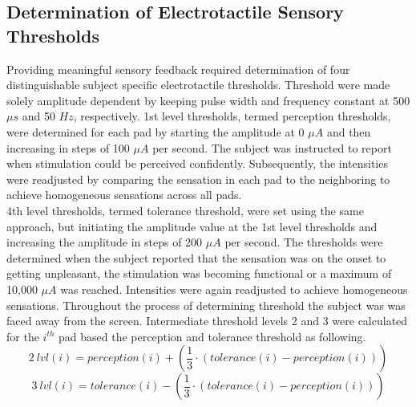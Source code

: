 
\subsection{Determination of Electrotactile Sensory Thresholds}


Providing meaningful sensory feedback required determination of four distinguishable subject specific electrotactile thresholds. Threshold were made solely amplitude dependent by keeping pulse width and frequency constant at 500 $\mu s$ and 50 $Hz$, respectively. 1st level thresholds, termed perception thresholds, were determined for each pad by starting the amplitude at 0 $\mu A$ and then increasing in steps of 100 $\mu A$ per second. The subject was instructed to report when stimulation could be perceived confidently. Subsequently, the intensities were readjusted by comparing the sensation in each pad to the neighboring to achieve homogeneous sensations across all pads. \\
4th level thresholds, termed tolerance threshold, were set using the same approach, but initiating the amplitude value at the 1st level thresholds and increasing the amplitude in steps of 200 $\mu A$ per second. The thresholds were determined when the subject reported that the sensation was on the onset to getting unpleasant, the stimulation was becoming functional or a maximum of 10,000 $\mu A$ was reached. Intensities were again readjusted to achieve homogeneous sensations. Throughout the process of determining threshold the subject was was faced away from the screen. Intermediate threshold levels 2 and 3 were calculated for the $i^{th}$ pad based the perception and tolerance threshold as following. 
\vspace{-0.2cm}
{\small 
\begin{equation}
2~lvl(i) = perception(i) + (\frac{1}{3} \cdot (tolerance(i) - perception(i)))
\end{equation}}
{\small
\begin{equation}
3~lvl(i) = tolerance(i) - (\frac{1}{3} \cdot (tolerance(i) - perception(i)))
\end{equation}
}